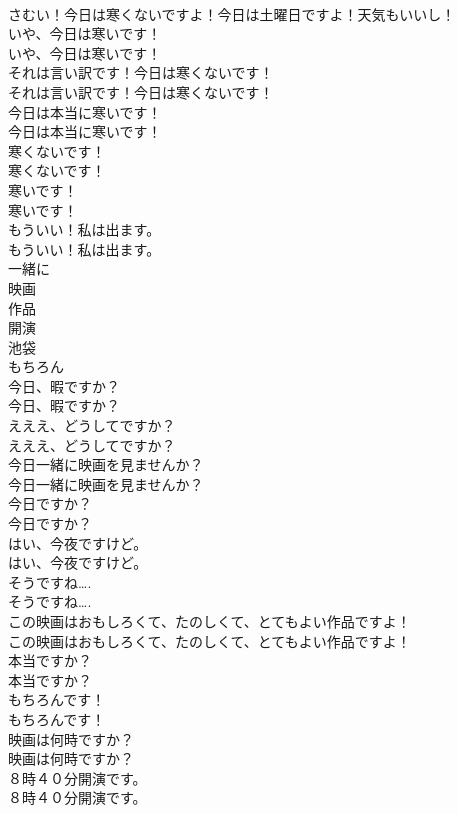 \documentclass[8pt]{extreport}
\begin{document}
\begin{CJK}{UTF8}{min}
\\	さむい！今日は寒くないですよ！今日は土曜日ですよ！天気もいいし！ 
\\	いや、今日は寒いです！	
\\	いや、今日は寒いです！ 
\\	それは言い訳です！今日は寒くないです！	
\\	それは言い訳です！今日は寒くないです！ 
\\	今日は本当に寒いです！	
\\	今日は本当に寒いです！ 
\\	寒くないです！	
\\	寒くないです！ 
\\	寒いです！	
\\	寒いです！ 
\\	もういい！私は出ます。	
\\	もういい！私は出ます。 
\\	一緒に
\\	映画
\\	作品
\\	開演
\\	池袋
\\	もちろん
\\	今日、暇ですか？	
\\	今日、暇ですか？ 
\\	えええ、どうしてですか？	
\\	えええ、どうしてですか？ 
\\	今日一緒に映画を見ませんか？	
\\	今日一緒に映画を見ませんか？ 
\\	今日ですか？	
\\	今日ですか？ 
\\	はい、今夜ですけど。	
\\	はい、今夜ですけど。 
\\	そうですね….	
\\	そうですね…. 
\\	この映画はおもしろくて、たのしくて、とてもよい作品ですよ！	
\\	この映画はおもしろくて、たのしくて、とてもよい作品ですよ！ 
\\	本当ですか？	
\\	本当ですか？ 
\\	もちろんです！	
\\	もちろんです！ 
\\	映画は何時ですか？	
\\	映画は何時ですか？ 
\\	８時４０分開演です。	
\\	８時４０分開演です。 

\end{CJK}
\end{document}
